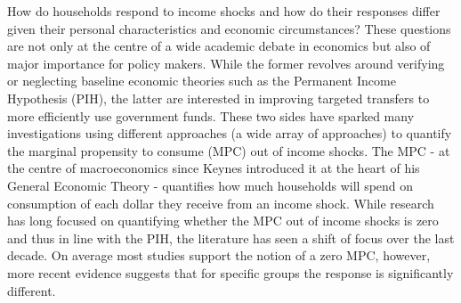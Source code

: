 How do households respond to income shocks and how do their responses differ given their personal characteristics and economic circumstances? These questions are not only at the centre of a wide academic debate in economics but also of major importance for policy makers. While the former revolves around verifying or neglecting baseline economic theories such as the Permanent Income Hypothesis (PIH), the latter are interested in improving targeted transfers to more efficiently use government funds. These two sides have sparked many investigations using different approaches (a wide array of approaches) to quantify the marginal propensity to consume (MPC) out of income shocks. The MPC - at the centre of macroeconomics since Keynes introduced it at the heart of his General Economic Theory - quantifies how much households will spend on consumption of each dollar they receive from an income shock. While research has long focused on quantifying whether the MPC out of income shocks is zero and thus in line with the PIH, the literature has seen a shift of focus over the last decade. On average most studies support the notion of a zero MPC, however, more recent evidence suggests that for specific groups the response is significantly different. \\
